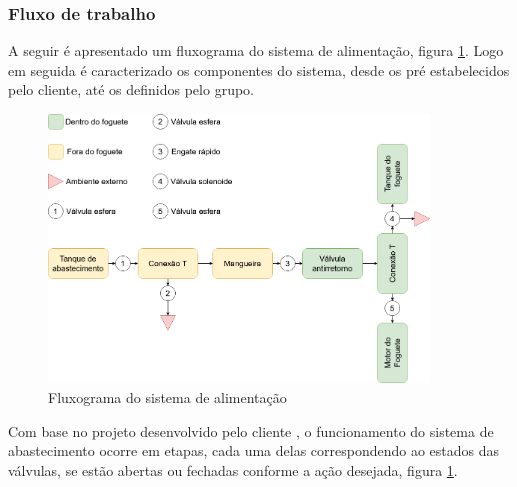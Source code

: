 \subsubsection{Fluxo de trabalho}

\par A seguir é apresentado um fluxograma do sistema de alimentação, figura \ref{fig:sistema de alimentacao}. Logo em seguida é caracterizado os componentes do sistema, desde os pré estabelecidos pelo cliente, até os definidos pelo grupo.

\begin{figure}[H]
\centering
\includegraphics[width=0.9\textwidth]{figuras/diagramaAlimentacao}
\caption{Fluxograma do sistema de alimentação}
\label{fig:sistema de alimentacao}
\end{figure}


\par Com base no projeto desenvolvido pelo cliente \cite{capitalrocketteam2020}, o funcionamento do sistema de abastecimento ocorre em etapas, cada uma delas correspondendo ao estados das válvulas, se estão abertas ou fechadas conforme a ação desejada, figura \ref{fig:sistema de alimentacao}. 

